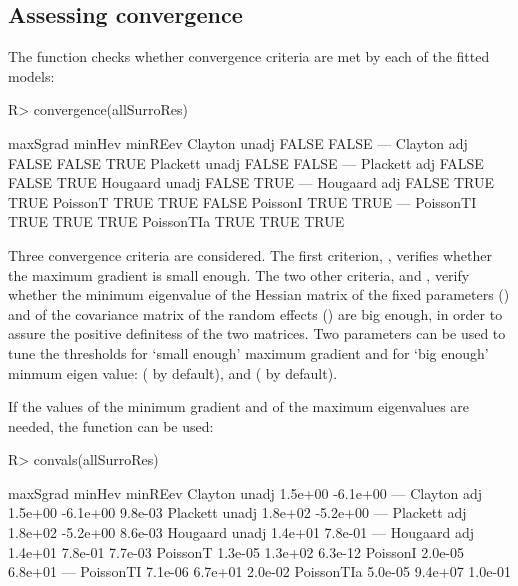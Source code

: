 \documentclass[article,shortnames, nojss]{jss}\usepackage[]{graphicx}\usepackage[]{color}
\begin{document}
\subsection{Assessing convergence}
The function  checks whether convergence criteria
  are met by each of the fitted models:
\begin{Schunk}
\begin{Sinput}
R>   convergence(allSurroRes)
\end{Sinput}
\begin{Soutput}
               maxSgrad minHev minREev
Clayton unadj     FALSE  FALSE     ---
Clayton adj       FALSE  FALSE    TRUE
Plackett unadj    FALSE  FALSE     ---
Plackett adj      FALSE  FALSE    TRUE
Hougaard unadj    FALSE   TRUE     ---
Hougaard adj      FALSE   TRUE    TRUE
PoissonT           TRUE   TRUE   FALSE
PoissonI           TRUE   TRUE     ---
PoissonTI          TRUE   TRUE    TRUE
PoissonTIa         TRUE   TRUE    TRUE
\end{Soutput}
\end{Schunk}
Three convergence criteria are considered.
The first criterion, ,
  verifies whether the maximum gradient is small enough.
The two other criteria,  and ,
  verify whether the minimum eigenvalue
  of the Hessian matrix of the fixed parameters ()
  and of the covariance matrix of the random effects ()
  are big enough,
  in order to assure the positive definitess of the two matrices.
Two parameters can be used to tune the thresholds
  for `small enough' maximum gradient and 
  for `big enough' minmum eigen value:
   ( by default),
  and  ( by default).

If the values of the minimum gradient and of the maximum eigenvalues are needed,
  the function  can be used:
\begin{Schunk}
\begin{Sinput}
R>   convals(allSurroRes)
\end{Sinput}
\begin{Soutput}
               maxSgrad   minHev minREev
Clayton unadj   1.5e+00 -6.1e+00     ---
Clayton adj     1.5e+00 -6.1e+00 9.8e-03
Plackett unadj  1.8e+02 -5.2e+00     ---
Plackett adj    1.8e+02 -5.2e+00 8.6e-03
Hougaard unadj  1.4e+01  7.8e-01     ---
Hougaard adj    1.4e+01  7.8e-01 7.7e-03
PoissonT        1.3e-05  1.3e+02 6.3e-12
PoissonI        2.0e-05  6.8e+01     ---
PoissonTI       7.1e-06  6.7e+01 2.0e-02
PoissonTIa      5.0e-05  9.4e+07 1.0e-01
\end{Soutput}
\end{Schunk}
\end{document}
